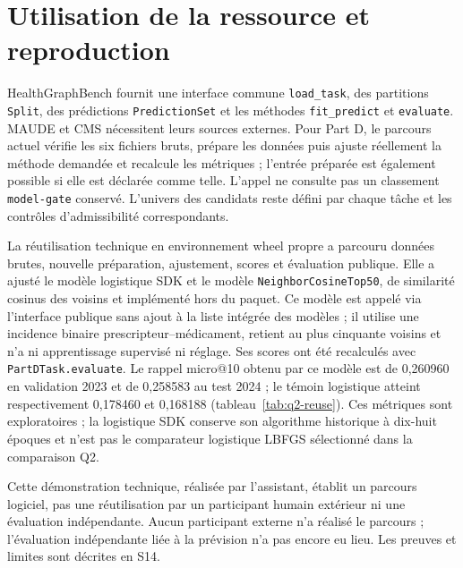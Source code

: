 \section{Utilisation de la ressource et reproduction}
\label{sec:repro}
HealthGraphBench fournit une interface commune \texttt{load\_task}, des partitions \texttt{Split}, des prédictions \texttt{PredictionSet} et les méthodes \texttt{fit\_predict} et \texttt{evaluate}\cite{hgbinterface}. MAUDE et CMS nécessitent leurs sources externes. Pour Part D, le parcours actuel vérifie les six fichiers bruts, prépare les données puis ajuste réellement la méthode demandée et recalcule les métriques ; l'entrée préparée est également possible si elle est déclarée comme telle. L'appel ne consulte pas un classement \texttt{model-gate} conservé. L'univers des candidats reste défini par chaque tâche et les contrôles d'admissibilité correspondants.

La réutilisation technique en environnement wheel propre a parcouru données brutes, nouvelle préparation, ajustement, scores et évaluation publique. Elle a ajusté le modèle logistique SDK et le modèle \texttt{NeighborCosineTop50}, de similarité cosinus des voisins et implémenté hors du paquet. Ce modèle est appelé via l'interface publique sans ajout à la liste intégrée des modèles ; il utilise une incidence binaire prescripteur--médicament, retient au plus cinquante voisins et n'a ni apprentissage supervisé ni réglage. Ses scores ont été recalculés avec \texttt{PartDTask.evaluate}. Le rappel micro@10 obtenu par ce modèle est de 0,260960 en validation 2023 et de 0,258583 au test 2024 ; le témoin logistique atteint respectivement 0,178460 et 0,168188 (tableau~\ref{tab:q2-reuse}). Ces métriques sont exploratoires ; la logistique SDK conserve son algorithme historique à dix-huit époques et n'est pas le comparateur logistique LBFGS sélectionné dans la comparaison Q2.

\begin{table}[!htbp]
\centering\small
\caption{Témoin technique de réutilisation Part D : ajustements réalisés et métriques recalculées avec l'évaluateur public en validation 2023 et au test 2024. Le modèle cosinus est implémenté hors paquet et non réglé ; la logistique SDK n'est pas le comparateur Q2. Ces résultats ne constituent ni une comparaison réglée supplémentaire ni une validation humaine.}
\label{tab:q2-reuse}

\end{table}

Cette démonstration technique, réalisée par l'assistant, établit un parcours logiciel, pas une réutilisation par un participant humain extérieur ni une évaluation indépendante. Aucun participant externe n'a réalisé le parcours ; l'évaluation indépendante liée à la prévision n'a pas encore eu lieu. Les preuves et limites sont décrites en S14.

